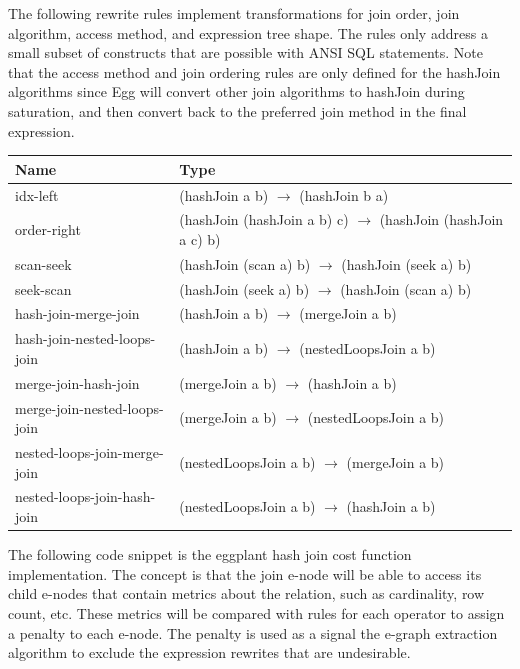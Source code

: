 \documentclass{article}
\begin{document}
The following rewrite rules implement transformations for join order,
join algorithm, access method, and expression tree shape.  The rules only address a small subset of 
constructs that are possible with ANSI SQL statements.  Note that the access method and join ordering
rules are only defined for the hashJoin algorithms since Egg will convert other join algorithms to 
hashJoin during saturation, and then convert back to the preferred join method in the final expression.

\noindent \begin{tabular}{ | l | l | }
\hline
\textbf{Name} & \textbf{Type}  \\ \hline
idx-left & (hashJoin a b) $\rightarrow$ (hashJoin b a)  \\ \hline
order-right & (hashJoin (hashJoin a b) c) $\rightarrow$ (hashJoin (hashJoin a c) b)  \\ \hline
scan-seek & (hashJoin (scan a) b) $\rightarrow$ (hashJoin (seek a) b)  \\ \hline
seek-scan & (hashJoin (seek a) b) $\rightarrow$ (hashJoin (scan a) b)  \\ \hline
hash-join-merge-join & (hashJoin a b) $\rightarrow$ (mergeJoin a b)  \\ \hline
hash-join-nested-loops-join & (hashJoin a b) $\rightarrow$ (nestedLoopsJoin a b) \\ \hline
merge-join-hash-join & (mergeJoin a b) $\rightarrow$ (hashJoin a b)  \\ \hline
merge-join-nested-loops-join & (mergeJoin a b) $\rightarrow$ (nestedLoopsJoin a b) \\ \hline
nested-loops-join-merge-join & (nestedLoopsJoin a b) $\rightarrow$ (mergeJoin a b)  \\ \hline
nested-loops-join-hash-join & (nestedLoopsJoin a b) $\rightarrow$ (hashJoin a b) \\ \hline
\end{tabular}

The following code snippet is the eggplant hash join cost function implementation.  The concept
is that the join e-node will be able to access its child e-nodes that contain metrics
about the relation, such as cardinality, row count, etc.  These metrics will be compared with
rules for each operator to assign a penalty to each e-node.  The penalty is used as a signal the 
e-graph extraction algorithm to exclude the expression rewrites that are undesirable.
\end{document}
